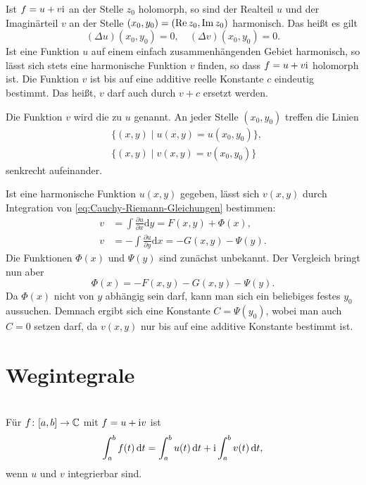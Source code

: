 \noindent
Ist $f=u+v\mathrm i$ an der Stelle $z_0$ holomorph, so sind der
Realteil $u$ und der Imaginärteil $v$
an der Stelle $(x_0,y_0)=(\operatorname{Re} z_0,\operatorname{Im} z_0)$ harmonisch.
Das heißt es gilt%
\begin{equation}
(\Delta u)(x_0,y_0) = 0,\quad (\Delta v)(x_0,y_0)=0.
\end{equation}
Ist eine Funktion $u$ auf einem einfach zusammenhängenden Gebiet
harmonisch, so lässt sich stets eine harmonische Funktion $v$
finden, so dass $f=u+v\mathrm i$ holomorph ist. Die Funktion $v$ ist
bis auf eine additive reelle Konstante $c$ eindeutig bestimmt.
Das heißt, $v$ darf auch durch $v+c$ ersetzt werden.

Die Funktion $v$ wird die 
zu $u$ genannt. An jeder Stelle $(x_0,y_0)$ treffen die Linien%
\begin{align}
&\{(x,y)\mid u(x,y)=u(x_0,y_0)\},\\
&\{(x,y)\mid v(x,y)=v(x_0,y_0)\} 
\end{align}
senkrecht aufeinander.

Ist eine harmonische Funktion $u(x,y)$ gegeben, lässt sich $v(x,y)$
durch Integration von \eqref{eq:Cauchy-Riemann-Gleichungen}
bestimmen:%
\begin{align}
v &= \int\frac{\partial u}{\partial x}\mathrm dy = F(x,y)+\Phi(x),\\
v &= -\int \frac{\partial u}{\partial y}\mathrm dx = -G(x,y)-\Psi(y).
\end{align}
Die Funktionen $\Phi(x)$ und $\Psi(y)$ sind zunächst unbekannt.
Der Vergleich bringt nun aber
\begin{equation}
\Phi(x) = -F(x,y)-G(x,y)-\Psi(y).
\end{equation}
Da $\Phi(x)$ nicht von $y$ abhängig sein darf, kann man sich ein
beliebiges festes $y_0$ aussuchen. Demnach ergibt sich eine Konstante
$C=\Psi(y_0)$, wobei man auch $C=0$ setzen darf, da $v(x,y)$ nur bis
auf eine additive Konstante bestimmt ist.

\newpage
\section{Wegintegrale}
\\
Für $f\colon [a,b]\to\mathbb C$ mit $f=u+\mathrm i v$ ist
\begin{equation}
\int_a^b f(t)\,\mathrm dt
= \int_a^b u(t)\,\mathrm dt+\mathrm i\int_a^b v(t)\,\mathrm dt,
\end{equation}
wenn $u$ und $v$ integrierbar sind.


